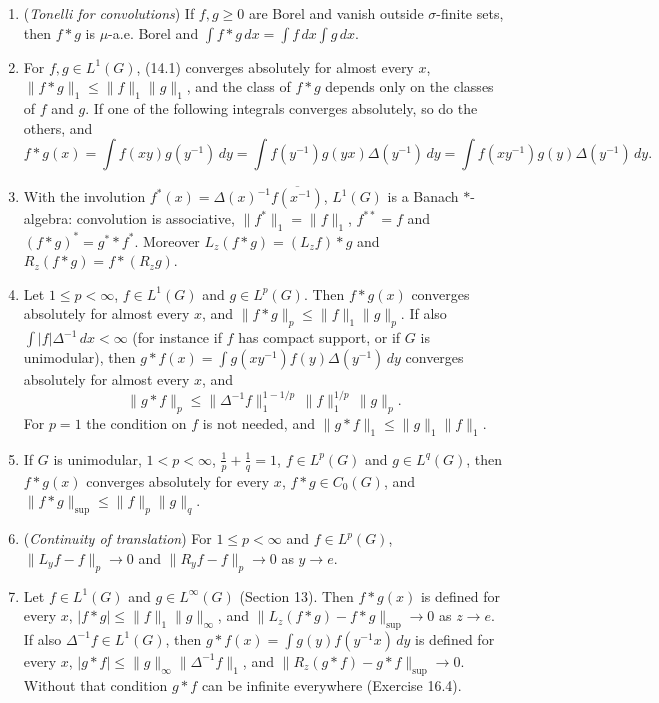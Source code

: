 \documentclass[
  english,
  11pt,
  a4paper,
]{article}
\providecommand{\tightlist}{%
  \setlength{\itemsep}{0pt}\setlength{\parskip}{0pt}}
\begin{document}
\begin{enumerate}
\tightlist
\item
  (\emph{Tonelli for convolutions}) If \(f,g\geq0\) are Borel and vanish
  outside \(\sigma\)-finite sets, then \(f*g\) is \(\mu\)-a.e. Borel and
  \(\int f*g\,dx=\int f\,dx\int g\,dx\).
\item
  For \(f,g\in L^1(G)\), (14.1) converges absolutely for almost every
  \(x\), \(\|f*g\|_1\leq\|f\|_1\|g\|_1\), and the class of \(f*g\)
  depends only on the classes of \(f\) and \(g\). If one of the
  following integrals converges absolutely, so do the others, and
  \[f*g(x)=\int f(xy)g(y^{-1})\,dy=\int f(y^{-1})g(yx)\Delta(y^{-1})\,dy=\int f(xy^{-1})g(y)\Delta(y^{-1})\,dy.
  \tag{14.2}\]
\item
  With the involution \(f^*(x)=\Delta(x)^{-1}\overline{f(x^{-1})}\),
  \(L^1(G)\) is a Banach \(*\)-algebra: convolution is associative,
  \(\|f^*\|_1=\|f\|_1\), \(f^{**}=f\) and \((f*g)^*=g^**f^*\). Moreover
  \(L_z(f*g)=(L_zf)*g\) and \(R_z(f*g)=f*(R_zg)\).
\item
  Let \(1\leq p<\infty\), \(f\in L^1(G)\) and \(g\in L^p(G)\). Then
  \(f*g(x)\) converges absolutely for almost every \(x\), and
  \(\|f*g\|_p\leq\|f\|_1\|g\|_p\). If also
  \(\int|f|\Delta^{-1}\,dx<\infty\) (for instance if \(f\) has compact
  support, or if \(G\) is unimodular), then
  \(g*f(x)=\int g(xy^{-1})f(y)\Delta(y^{-1})\,dy\) converges absolutely
  for almost every \(x\), and
  \[\|g*f\|_p\leq\|\Delta^{-1}f\|_1^{1-1/p}\,\|f\|_1^{1/p}\,\|g\|_p .
  \tag{14.3}\] For \(p=1\) the condition on \(f\) is not needed, and
  \(\|g*f\|_1\leq\|g\|_1\|f\|_1\).
\item
  If \(G\) is unimodular, \(1<p<\infty\), \(\frac1p+\frac1q=1\),
  \(f\in L^p(G)\) and \(g\in L^q(G)\), then \(f*g(x)\) converges
  absolutely for every \(x\), \(f*g\in C_0(G)\), and
  \(\|f*g\|_{\sup}\leq\|f\|_p\|g\|_q\).
\item
  (\emph{Continuity of translation}) For \(1\leq p<\infty\) and
  \(f\in L^p(G)\), \(\|L_yf-f\|_p\to0\) and \(\|R_yf-f\|_p\to0\) as
  \(y\to e\).
\item
  Let \(f\in L^1(G)\) and \(g\in L^\infty(G)\) (Section 13). Then
  \(f*g(x)\) is defined for every \(x\),
  \(|f*g|\leq\|f\|_1\|g\|_\infty\), and \(\|L_z(f*g)-f*g\|_{\sup}\to0\)
  as \(z\to e\). If also \(\Delta^{-1}f\in L^1(G)\), then
  \(g*f(x)=\int g(y)f(y^{-1}x)\,dy\) is defined for every \(x\),
  \(|g*f|\leq\|g\|_\infty\|\Delta^{-1}f\|_1\), and
  \(\|R_z(g*f)-g*f\|_{\sup}\to0\). Without that condition \(g*f\) can be
  infinite everywhere (Exercise 16.4).
\end{enumerate}
\end{document}
